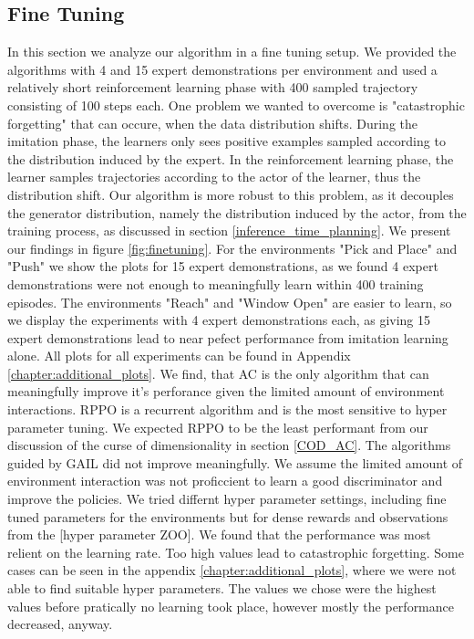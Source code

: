 \subsection{Fine Tuning}
In this section we analyze our algorithm in a fine tuning setup. We provided the algorithms with 4 and 15 expert demonstrations per environment and used a relatively short reinforcement learning phase 
with 400 sampled trajectory consisting of 100 steps each. One problem we wanted to overcome is "catastrophic 
forgetting" that can occure, when the data distribution shifts. During the imitation phase, the learners only sees positive examples sampled according to the distribution induced by the expert. 
In the reinforcement learning phase, the learner samples trajectories according to the actor of the learner, thus the distribution shift. Our algorithm is more robust to this problem, as it 
decouples the generator distribution, namely the distribution induced by the actor, from the training process, as discussed in section \ref{inference_time_planning}. We present our findings in 
figure \ref{fig:finetuning}. For the environments "Pick and Place" and "Push" we show the plots 
for 15 expert demonstrations, as we found 4 expert demonstrations were not enough to meaningfully learn within 400 training episodes. The environments "Reach" and "Window Open" are easier to learn, 
so we display the experiments with 4 expert demonstrations each, as giving 15 expert demonstrations lead to near pefect performance from imitation learning alone. All plots for all experiments can 
be found in Appendix \ref{chapter:additional_plots}. 
We find, that AC is the only algorithm that can meaningfully improve it's perforance given the limited amount of environment interactions. RPPO is a recurrent algorithm and is the most sensitive to hyper parameter tuning. 
We expected RPPO to be the least performant from our discussion of the curse of dimensionality in section \ref{COD_AC}. The algorithms guided by GAIL did not improve meaningfully. We assume the limited 
amount of environment interaction was not proficcient to learn a good discriminator and improve the policies. We tried differnt hyper parameter settings, including fine tuned parameters for the 
environments but for dense rewards and observations from the [hyper parameter ZOO]. We found that the performance was most relient on the learning rate. Too high values lead to catastrophic forgetting. Some cases can be seen in 
the appendix \ref{chapter:additional_plots}, where we were not able to find suitable hyper parameters. The values we chose were the highest values before pratically no learning took place, however 
mostly the performance decreased, anyway.


